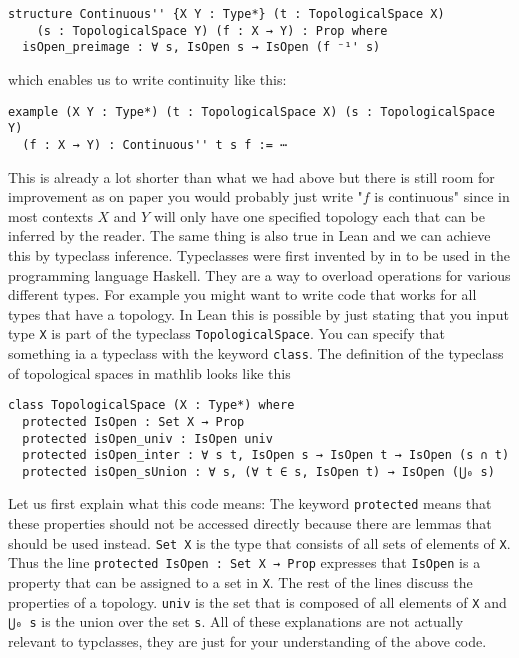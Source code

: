 \begin{lstlisting}
structure Continuous'' {X Y : Type*} (t : TopologicalSpace X) 
    (s : TopologicalSpace Y) (f : X → Y) : Prop where
  isOpen_preimage : ∀ s, IsOpen s → IsOpen (f ⁻¹' s)
\end{lstlisting}

which enables us to write continuity like this: 

\begin{lstlisting}
example (X Y : Type*) (t : TopologicalSpace X) (s : TopologicalSpace Y) 
  (f : X → Y) : Continuous'' t s f := ⋯
\end{lstlisting}

This is already a lot shorter than what we had above but there is still room for improvement as on paper you would probably just write "$f$ is continuous" since in most contexts $X$ and $Y$ will only have one specified topology each that can be inferred by the reader.
The same thing is also true in Lean and we can achieve this by typeclass inference.
Typeclasses were first invented by  in \cite{Wadler1989} to be used in the programming language Haskell. 
They are a way to overload operations for various different types. 
For example you might want to write code that works for all types that have a topology. 
In Lean this is possible by just stating that you input type \lstinline{X} is part of the typeclass \lstinline{TopologicalSpace}. 
You can specify that something ia a typeclass with the keyword \lstinline{class}. 
The definition of the typeclass of topological spaces in mathlib looks like this

\begin{lstlisting}
class TopologicalSpace (X : Type*) where
  protected IsOpen : Set X → Prop
  protected isOpen_univ : IsOpen univ
  protected isOpen_inter : ∀ s t, IsOpen s → IsOpen t → IsOpen (s ∩ t)
  protected isOpen_sUnion : ∀ s, (∀ t ∈ s, IsOpen t) → IsOpen (⋃₀ s)
\end{lstlisting}

Let us first explain what this code means: 
The keyword \lstinline{protected} means that these properties should not be accessed directly because there are lemmas that should be used instead. 
\lstinline{Set X} is the type that consists of all sets of elements of \lstinline{X}.
Thus the line \lstinline{protected IsOpen : Set X → Prop} expresses that \lstinline{IsOpen} is a property that can be assigned to a set in \lstinline{X}.
The rest of the lines discuss the properties of a topology.
\lstinline{univ} is the set that is composed of all elements of \lstinline{X} and \lstinline{⋃₀ s} is the union over the set \lstinline{s}. 
All of these explanations are not actually relevant to typclasses, they are just for your understanding of the above code. 

